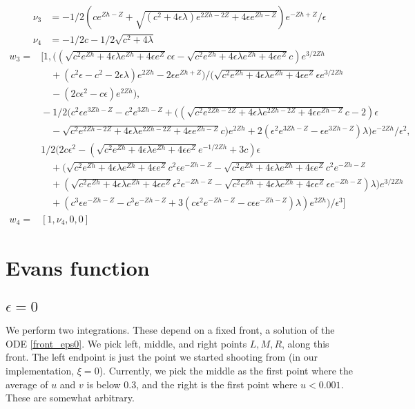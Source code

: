 \documentclass[10pt]{article}
\begin{document}
\begin{align*}
    \nu_3 &=-1/2 \left(c e^{Z h - Z} + \sqrt{(c^2 + 4 \epsilon \lambda) e^{2 Z h - 2 Z} +
4 \epsilon e^{Z h - Z}}\right) e^{-Z h + Z}/\epsilon
\\
    \nu_4 &= -1/2 c - 1/2 \sqrt{c^2 + 4 \lambda}
\end{align*}
\begin{align*}
    w_3 =& [1, ((\sqrt{c^2 e^{Z h} +
4 \epsilon \lambda e^{Z h} + 4 \epsilon e^Z} c \epsilon - \sqrt{c^2 e^{Z h} +
4 \epsilon \lambda e^{Z h} + 4 \epsilon e^Z} c) e^{3/2 Z h} \\
& \quad + (c^2 \epsilon - c^2 -
2 \epsilon \lambda) e^{2 Z h} - 2 \epsilon e^{Z h + Z})/(\sqrt{c^2 e^{Z h} +
4 \epsilon \lambda e^{Z h} + 4 \epsilon e^Z} \epsilon e^{3/2 Z h} \\
& \quad - (2 c \epsilon^2 -
    c \epsilon) e^{2 Z h}), \\
    &\!-1/2 (c^2 \epsilon e^{3 Z h - Z} - c^2 e^{3 Z h - Z} +
    ((\sqrt{c^2 e^{2 Z h - 2 Z} + 4 \epsilon \lambda e^{2 Z h - 2 Z} + 4 \epsilon e^{Z h
    - Z}} c - 2) \epsilon \\
    & \quad - \sqrt{c^2 e^{2 Z h - 2 Z} + 4 \epsilon \lambda e^{2 Z h -
    2 Z} + 4 \epsilon e^{Z h - Z}} c) e^{2 Z h} + 2 (\epsilon^2 e^{3 Z h - Z} -
    \epsilon e^{3 Z h - Z}) \lambda) e^{-2 Z h}/\epsilon^2, \\
    & 1/2 (2 c \epsilon^2 -
    (\sqrt{c^2 e^{Z h} + 4 \epsilon \lambda e^{Z h} + 4 \epsilon e^Z} e^{-1/2 Z h} +
    3 c) \epsilon \\
    & \quad + (\sqrt{c^2 e^{Z h} + 4 \epsilon \lambda e^{Z h} +
    4 \epsilon e^Z} c^2 \epsilon e^{-Z h - Z} - \sqrt{c^2 e^{Z h} + 4 \epsilon \lambda e^{Z h}
    + 4 \epsilon e^Z} c^2 e^{-Z h - Z} \\ 
    & \quad + (\sqrt{c^2 e^{Z h} + 4 \epsilon \lambda e^{Z h}
    + 4 \epsilon e^Z} \epsilon^2 e^{-Z h - Z} - \sqrt{c^2 e^{Z h} + 4 \epsilon \lambda e^{Z h}
    + 4 \epsilon e^Z} \epsilon e^{-Z h - Z}) \lambda) e^{3/2 Z h} \\
    & \quad + (c^3 \epsilon e^{-Z h -
    Z} - c^3 e^{-Z h - Z} + 3 (c \epsilon^2 e^{-Z h - Z} - c \epsilon e^{-Z h -
Z}) \lambda) e^{2 Z h})/\epsilon^3]
\\
w_4 =& [1, \nu_4, 0, 0]
\end{align*}

\section{Evans function}
\subsection{$\epsilon = 0$}
We perform two integrations.
These depend on a fixed front, a solution of the ODE \eqref{front_eps0}.
We pick left, middle, and right points $L, M, R$, along this front.
The left endpoint is just the point we started shooting from (in our implementation, $\xi=0$).
Currently, we pick the middle as the first point where the average of $u$ and $v$ is below 0.3,
and the right is the first point where $u < 0.001$.
These are somewhat arbitrary.
\end{document}
